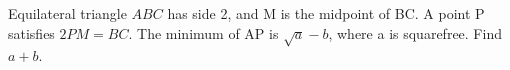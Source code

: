 Equilateral triangle $ABC$ has side 2, and M is the midpoint of BC. A point P satisfies $2PM=BC$. The minimum of AP is $\sqrt a-b$, where a is squarefree. Find $a+b$.
